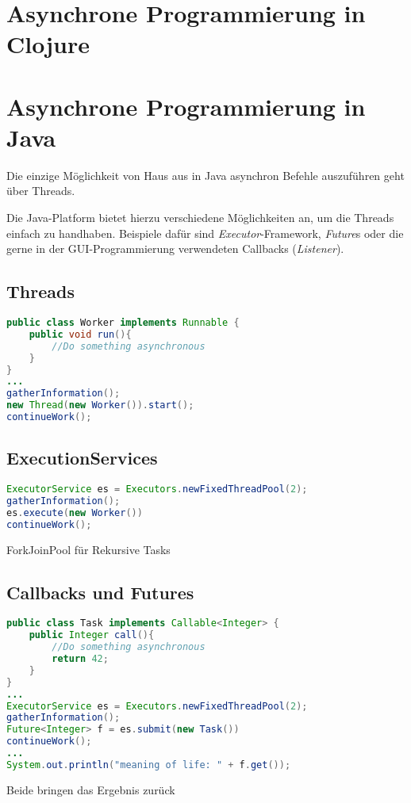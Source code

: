 \section{Asynchrone Programmierung in Clojure}




\section{Asynchrone Programmierung in Java}
Die einzige Möglichkeit von Haus aus in Java asynchron Befehle auszuführen geht über Threads.

Die Java-Platform bietet hierzu verschiedene Möglichkeiten an, um die Threads einfach zu handhaben. Beispiele dafür sind \textit{Executor}-Framework, \textit{Future}s oder die gerne in der \acs{GUI}-Programmierung verwendeten Callbacks (\textit{Listener}).

\subsection{Threads}

\begin{lstlisting}[language=Java,caption=Definition und Erzeugung eines Threads,label=lst:java_thread]
public class Worker implements Runnable {
	public void run(){
		//Do something asynchronous 	
	}
}
...
gatherInformation();
new Thread(new Worker()).start(); 
continueWork();
\end{lstlisting}


\subsection{ExecutionServices}

\begin{lstlisting}[language=Java,caption=Verwendung eines ExecutionServices,label=lst:java_executionservice]
ExecutorService es = Executors.newFixedThreadPool(2);
gatherInformation();
es.execute(new Worker())
continueWork();
\end{lstlisting}

ForkJoinPool für Rekursive Tasks

\subsection{Callbacks und Futures}
\begin{lstlisting}[language=Java,caption=Verwendung von Futures,label=lst:java_futures]
public class Task implements Callable<Integer> {
	public Integer call(){
		//Do something asynchronous
		return 42; 	
	}
}
...
ExecutorService es = Executors.newFixedThreadPool(2);
gatherInformation();
Future<Integer> f = es.submit(new Task())
continueWork();
...
System.out.println("meaning of life: " + f.get());


\end{lstlisting}
Beide bringen das Ergebnis zurück

